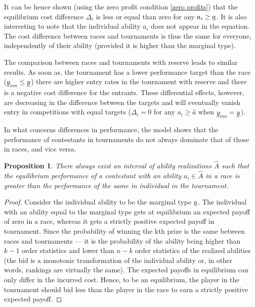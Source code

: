 \documentclass[10pt, titlepage]{article}
\newtheorem{proposition}{Proposition}
\newcommand\target{\underline{y}}
\newcommand\marginaltype{\hat{a}}
\begin{document}
It can be hence shown (using the zero profit condition
\eqref{zero profits}) that the equilibrium cost difference \(\Delta_i\)
is less or equal than zero for any \(a_i\geq \underline{a}\). It is also
interesting to note that the individual ability \(a_i\) does not appear
in the equation. The cost difference between races and tournaments is
thus the same for everyone, independently of their ability (provided it
is higher than the marginal type).

The comparison between races and tournaments with reserve leads to
similar results. As soon as, the tournament has a lower performance
target than the race (\(\target_{\reserve} \leq \target\)) there are
higher entry rates in the tournament with reserve and there is a
negative cost difference for the entrants. These differential effects,
however, are decreasing in the difference between the targets and will
eventually vanish entry in competitions with equal targets
(\(\Delta_{i}=0\) for any \(a_i\geq\marginaltype\) when
\(\target_{\reserve}=\target\)).

In what concerns differences in performance, the model shows that the
performance of contestants in tournaments do not always dominate that of
those in races, and vice versa.

\begin{proposition}
There always exist an interval of ability realizations $\hat A$ such that the equilibrium performance of a contestant with an ability $a_i\in \hat A$ in a race is greater than the performance of the same in  individual in the tournament.
\end{proposition}

\begin{proof}
Consider the individual ability to be the marginal type $\underline{a}$. The individual with an ability equal to the marginal type gets at equilibrium an expected payoff of zero in a race, whereas it gets a strictly positive expected payoff in tournament. Since the probability of winning the kth prize is the same between races and tournaments --- it is the probability of the ability being higher than $k-1$ order statistics and lower than $n-k$ order statistics of the realized abilities (the bid is a monotonic transformation of the individual ability or, in other words, rankings are virtually the same). The expected payoffs in equilibrium can only differ in the incurred cost. Hence, to be an equilibrium, the player in the tournament should bid less than the player in the race to earn a strictly positive expected payoff. 
\end{proof}
\end{document}
